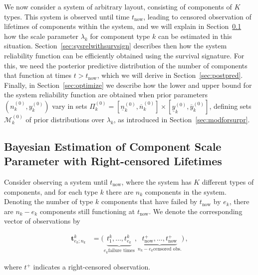 \documentclass[Journal,SectionNumbers,SingleSpace,InsideFigs]{ascelike}
\renewcommand{\vec}[1]{{\bm#1}}
\newcommand{\uz}{^{(0)}} %
\newcommand{\ul}[1]{\underline{#1}}
\newcommand{\ol}[1]{\overline{#1}}
\def\ykz{y\uz_k}
\def\ykzl{\ul{y}\uz_k}
\def\ykzu{\ol{y}\uz_k}
\def\nkz{n\uz_k}
\def\nkzl{\ul{n}\uz_k}
\def\nkzu{\ol{n}\uz_k}
\def\MkZ{\mathcal{M}\uz_k}
\def\PkZ{\Pi\uz_k}
\def\tnow{t_\text{now}}
\def\tpnow{t^+_\text{now}}
\begin{document}
We now consider a system of arbitrary layout,
consisting of components of $K$ types.
This system is observed until time $\tnow$,
leading to censored observation of lifetimes of components within the system,
and we will explain in Section~\ref{sec:lambdawithcens}
how the scale parameter $\lambda_k$ for component type $k$
can be estimated in this situation.
%
Section~\ref{sec:sysrelwithsurvsign} describes then
how the system reliability function can be efficiently obtained using the survival signature.
%
For this, we need the posterior predictive distribution
of the number of components that function at times $t > \tnow$,
which we will derive in Section~\ref{sec:postpred}.
%
Finally, in Section~\ref{sec:optimize} we describe how
the lower and upper bound for the system reliability function
are obtained when prior parameters $(\nkz,\ykz)$
vary in sets $\PkZ = [\nkzl,\nkzu] \times [\ykzl,\ykzu]$,
defining sets $\MkZ$ of prior distributions over $\lambda_k$,
as introduced in Section~\ref{sec:modforsurpr}.


\subsection{Bayesian Estimation of Component Scale Parameter with Right-censored Lifetimes}
\label{sec:lambdawithcens}

Consider observing a system until $\tnow$,
where the system has $K$ different types of components,
and for each type $k$ there are $n_k$ components in the system.
Denoting the number of type $k$ components that have failed by $\tnow$ by $e_k$,
there are $n_k - e_k$ components still functioning at $\tnow$.
We denote the corresponding vector of observations by
\begin{linenomath*}
\begin{align}
\vec{t}^k_{e_k;n_k} &= \big( \underbrace{t^k_1, \ldots, t^k_{e_k}}_{e_k \text{failure times}},
                             \underbrace{\tpnow, \ldots, \tpnow}_{n_k-e_k \text{censored obs.}} \big)\,,
\end{align}
\end{linenomath*}
where $t^+$ indicates a right-censored observation.
%
\end{document}
